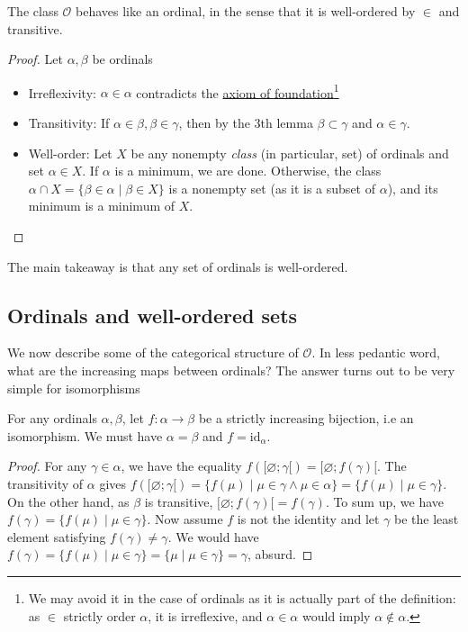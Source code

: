 \documentclass{article}
\begin{document}
\begin{theorem}
    The class $\mathcal{O}$ behaves like an ordinal, in the sense that it is well-ordered by $\in$ and transitive. 
\end{theorem}
\begin{proof}
    Let $\alpha, \beta$ be ordinals
    \begin{itemize}
        \item Irreflexivity: $\alpha \in \alpha$ contradicts the \href{https://en.wikipedia.org/wiki/Axiom_of_regularity#No_set_is_an_element_of_itself}{axiom of foundation}\footnote{We may avoid it in the case of ordinals as it is actually part of the definition: as $\in$ strictly order $\alpha$, it is irreflexive, and $\alpha \in \alpha$ would imply $\alpha \not\in \alpha$.}
        \item Transitivity: If $\alpha \in \beta, \beta \in \gamma$, then by the 3th lemma $\beta \subset \gamma$ and $\alpha \in \gamma$.
        \item Well-order: Let $X$ be any nonempty \textit{class} (in particular, set) of ordinals and set $\alpha \in X$. If $\alpha$ is a minimum, we are done. Otherwise, the class $\alpha \cap X = \{\beta \in \alpha \mid \beta \in X\}$ is a nonempty set (as it is a subset of $\alpha$), and its minimum is a minimum of $X$.
    \end{itemize}
\end{proof}
The main takeaway is that any set of ordinals is well-ordered. 


\subsection{Ordinals and well-ordered sets}

We now describe some of the categorical structure of $\mathcal{O}$. In less pedantic word, what are the increasing maps between ordinals? The answer turns out to be very simple for isomorphisms
\begin{proposition}
    For any ordinals $\alpha, \beta$, let $f: \alpha \to \beta$ be a strictly increasing bijection, i.e an isomorphism. We must have $\alpha = \beta$ and $f = \mathrm{id}_\alpha$.
\end{proposition}
\begin{proof}
    For any $\gamma \in \alpha$, we have the equality $f([\varnothing; \gamma[) = [\varnothing; f(\gamma)[$. The transitivity of $\alpha$ gives $f([\varnothing; \gamma[) = \{f(\mu) \mid \mu \in \gamma \land \mu \in \alpha\} = \{f(\mu) \mid \mu \in \gamma\}$. On the other hand, as $\beta$ is transitive, $[\varnothing; f(\gamma)[ = f(\gamma)$. To sum up, we have $f(\gamma) = \{f(\mu) \mid \mu \in \gamma\}$. Now assume $f$ is not the identity and let $\gamma$ be the least element satisfying $f(\gamma) \neq \gamma$. We would have $f(\gamma) = \{f(\mu) \mid \mu \in \gamma\} = \{\mu \mid \mu \in \gamma\} = \gamma$, absurd.
\end{proof}
\end{document}
